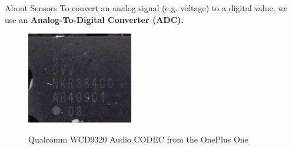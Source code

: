\documentclass[aspectratio=169]{beamer}
\begin{document}
\begin{frame}[fragile]{About Sensors}
\small{To convert an analog signal (e.g. voltage) to a digital value, we use an {\bf Analog-To-Digital Converter (ADC).}}	\\
\vspace{0.5em}
\begin{figure}[b]
\centering
\includegraphics[width=\textwidth,height=4cm,keepaspectratio]{img/wcd9320_2.png}

\vspace{0.5em}
\begin{footnotesize}Qualcomm WCD9320 Audio CODEC from the OnePlus One\end{footnotesize}
\end{figure}
\end{frame}	
	
	
	
\end{document}
